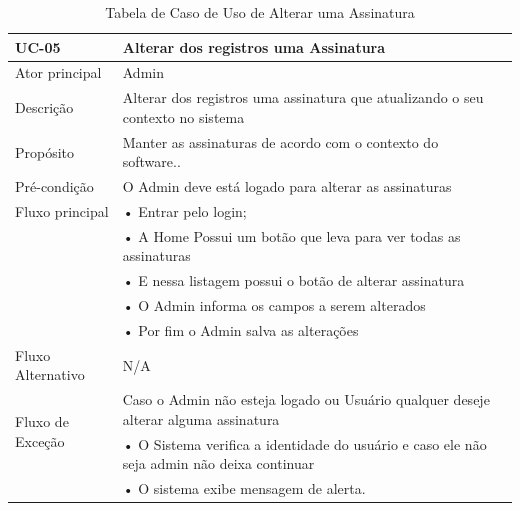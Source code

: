\documentclass[a4paper,12pt]{article}
\begin{document}
\begin{table}[ht]
    \centering
    \begin{tabular}{|p{3.5cm}|p{10cm}|p{7cm}|}
        \hline
        \textbf{UC-05}                     & \textbf{Alterar dos registros uma Assinatura}                                              \\
        \hline

        \multirow{1}{*}{Ator principal}    & Admin                                                                                      \\
        \hline
        \multirow{1}{*}{Descrição}         & Alterar dos registros uma assinatura que atualizando o seu contexto no sistema             \\
        \hline

        \multirow{1}{*}{Propósito}         & Manter as assinaturas de acordo com o contexto do software..                               \\
        \hline

        \multirow{1}{*}{Pré-condição}      & O Admin deve está logado para alterar as assinaturas                                       \\
        \hline

        \multirow{1}{*}{Fluxo principal}
                                           & • Entrar pelo login;                                                                       \\
                                           & • A Home Possui um botão que leva para ver todas as assinaturas                            \\
                                           & • E nessa listagem possui o botão de alterar assinatura                                    \\
                                           & • O Admin informa os campos a serem alterados                                              \\
                                           & • Por fim o Admin salva as alterações                                                      \\
        \cline{2-2}
        \hline

        \multirow{1}{*}{Fluxo Alternativo} & N/A                                                                                        \\
        \hline

        \multirow{2}{*}{Fluxo de Exceção}
                                           & Caso o Admin não esteja logado ou Usuário qualquer deseje alterar alguma  assinatura       \\
                                           & • O Sistema verifica a identidade do usuário e caso ele não seja admin não deixa continuar \\
                                           & • O sistema exibe mensagem de alerta.                                                      \\
        \hline
    \end{tabular}
    \caption{Tabela de Caso de Uso de Alterar uma Assinatura}
\end{table}
\end{document}
